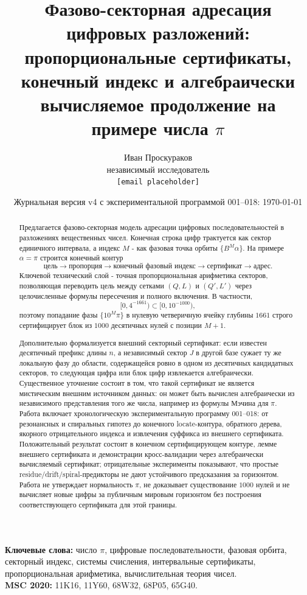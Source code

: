 \documentclass[11pt,a4paper]{article}
\title{Фазово-секторная адресация цифровых разложений:\\
пропорциональные сертификаты, конечный индекс и алгебраически вычисляемое продолжение на примере числа $\pi$}
\author{Иван Проскураков\\\small независимый исследователь\\\small \texttt{[email placeholder]}}
\date{Журнальная версия v4 с экспериментальной программой 001--018: \today}
\begin{document}
\maketitle

\begin{abstract}
Предлагается фазово-секторная модель адресации цифровых последовательностей в разложениях вещественных чисел.  Конечная строка цифр трактуется как сектор единичного интервала, а индекс $M$ - как фазовая точка орбиты $\{B^M\alpha\}$.  На примере $\alpha=\pi$ строится конечный контур
\[
  \text{цель}\to\text{пропорция}\to\text{конечный фазовый индекс}\to\text{сертификат}\to\text{адрес}.
\]
Ключевой технический слой - точная пропорциональная арифметика секторов, позволяющая переводить цель между сетками $(Q,L)$ и $(Q',L')$ через целочисленные формулы пересечения и полного включения.  В частности,
\[
  [0,4^{-1661})\subset[0,10^{-1000}),
\]
поэтому попадание фазы $\{10^M\pi\}$ в нулевую четверичную ячейку глубины $1661$ строго сертифицирует блок из $1000$ десятичных нулей с позиции $M+1$.

Дополнительно формализуется внешний секторный сертификат: если известен десятичный префикс длины $n$, а независимый сектор $J$ в другой базе сужает ту же локальную фазу до области, содержащейся ровно в одном из десятичных кандидатных секторов, то следующая цифра или блок цифр извлекается алгебраически.  Существенное уточнение состоит в том, что такой сертификат не является мистическим внешним источником данных: он может быть вычислен алгебраически из независимого представления того же числа, например из формулы Мэчина для $\pi$.  Работа включает хронологическую экспериментальную программу 001--018: от резонансных и спиральных гипотез до конечного locate-контура, обратного дерева, якорного отрицательного индекса и извлечения суффикса из внешнего сертификата.  Положительный результат состоит в конечном сертифицирующем контуре, лемме внешнего сертификата и демонстрации кросс-валидации через алгебраически вычисляемый сертификат; отрицательные эксперименты показывают, что простые residue/drift/spiral-предикторы не дают устойчивого предсказания за горизонтом.  Работа не утверждает нормальность $\pi$, не доказывает существование $1000$ нулей и не вычисляет новые цифры за публичным мировым горизонтом без построения соответствующего сертификата для этой границы.
\end{abstract}

\noindent\textbf{Ключевые слова:} число $\pi$, цифровые последовательности, фазовая орбита, секторный индекс, системы счисления, интервальные сертификаты, пропорциональная арифметика, вычислительная теория чисел.\\
\noindent\textbf{MSC 2020:} 11K16, 11Y60, 68W32, 68P05, 65G40.
\end{document}
